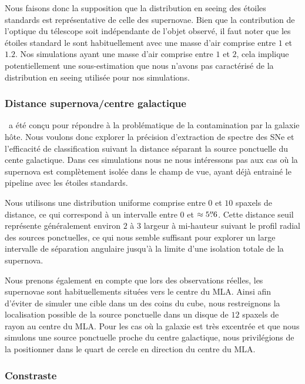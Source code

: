 \documentclass[../main/main.tex]{subfiles}
\begin{document}
Nous faisons donc la supposition que la distribution en seeing des
étoiles standards est représentative de celle des supernovae. Bien que
la contribution de l'optique du télescope soit indépendante
de l'objet observé, il faut noter que les étoiles standard le sont
habituellement avec une masse d'air comprise entre $1$ et
$1.2$. Nos simulations ayant une masse d'air comprise entre $1$ et $2$, cela implique potentiellement une sous-estimation que nous
n'avons pas caractérisé de la
distribution en seeing utilisée pour nos simulations.

\subsubsection{Distance supernova/centre galactique}\label{ssec:distancesimu}

\hypergal\ a été conçu pour répondre à la problématique de la
contamination par la galaxie hôte. Nous voulons donc explorer la
précision d'extraction de spectre des SNe et l'efficacité de
classification suivant la distance séparant la source ponctuelle du
cente galactique. Dans ces simulations nous ne nous intéressons pas aux
cas où la supernova est complètement isolée dans le champ de vue, ayant
déjà entrainé le pipeline avec les étoiles standards.

Nous utilisons une distribution uniforme comprise entre $0$ et $10$
spaxels de distance, ce qui correspond à un intervalle entre $0$ et
$\approx5\overset{\prime\prime}{.}6$. Cette distance seuil représente généralement environ $2$ à $3$ largeur à
mi-hauteur suivant le profil radial des sources ponctuelles, ce qui nous
semble suffisant pour explorer un large intervalle de séparation
angulaire jusqu'à la limite d'une isolation totale de la supernova.

Nous prenons également en compte que lors des observations réelles, les
supernovae sont habituellements situées vers le centre du MLA. Ainsi
afin d'éviter de simuler une cible dans un des coins du cube, nous
restreignons la localisation possible de la source ponctuelle dans un
disque de $12$ spaxels de rayon au centre du MLA. Pour les cas où la
galaxie est très excentrée et que nous simulons une source ponctuelle
proche du centre galactique, nous privilégions de la positionner dans le
quart de cercle en direction du centre du MLA. 

\subsubsection{Constraste}
\end{document}
